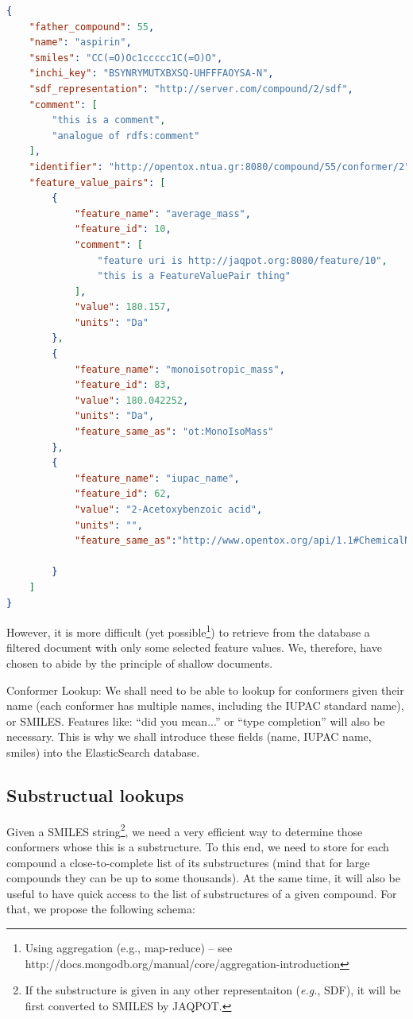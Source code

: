 \begin{lstlisting}[language=json]
{ 
    "father_compound": 55, 
    "name": "aspirin", 
    "smiles": "CC(=O)Oc1ccccc1C(=O)O", 
    "inchi_key": "BSYNRYMUTXBXSQ-UHFFFAOYSA-N", 
    "sdf_representation": "http://server.com/compound/2/sdf", 
    "comment": [ 
        "this is a comment", 
        "analogue of rdfs:comment" 
    ], 
    "identifier": "http://opentox.ntua.gr:8080/compound/55/conformer/2", 
    "feature_value_pairs": [ 
        { 
            "feature_name": "average_mass", 
            "feature_id": 10, 
            "comment": [ 
                "feature uri is http://jaqpot.org:8080/feature/10", 
                "this is a FeatureValuePair thing" 
            ], 
            "value": 180.157, 
            "units": "Da" 
        }, 
        { 
            "feature_name": "monoisotropic_mass", 
            "feature_id": 83, 
            "value": 180.042252, 
            "units": "Da", 
            "feature_same_as": "ot:MonoIsoMass" 
        }, 
        { 
            "feature_name": "iupac_name", 
            "feature_id": 62, 
            "value": "2-Acetoxybenzoic acid", 
            "units": "", 
            "feature_same_as":"http://www.opentox.org/api/1.1#ChemicalName"

        } 
    ] 
} 
\end{lstlisting}

However, it is more difficult (yet possible\footnote{Using aggregation (e.g., map-reduce) -- 
see http://docs.mongodb.org/manual/core/aggregation-introduction}) to retrieve from the database a 
filtered document with only some selected feature values. We, therefore, have 
chosen to abide by the principle of shallow documents.

Conformer Lookup: We shall need to be able to lookup for conformers given their
name (each conformer has multiple names, including the IUPAC standard name), or 
SMILES. Features like: ``did you mean...'' or ``type completion'' will also be necessary. 
This is why we shall introduce these fields (name, IUPAC name, smiles) into the ElasticSearch database.

\subsection{Substructual lookups}
Given a SMILES string\footnote{ If the substructure is given in any other representaiton 
(\textit{e.g.}, SDF), it will be first converted to SMILES by JAQPOT.}, we need a very efficient 
way to determine those conformers whose this is a substructure. To this end, we need to 
store for each compound a close-to-complete list of its substructures (mind that for large 
compounds they can be up to some thousands). At the same time, it will also be useful to 
have quick access to the list of substructures of a given compound. For that, we propose 
the following schema:

